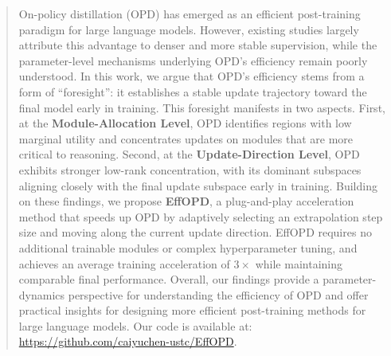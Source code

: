 \documentclass{article}
\begin{document}
\begin{abstract}
On-policy distillation (OPD) has emerged as an efficient post-training paradigm for large language models. However, existing studies largely attribute this advantage to denser and more stable supervision, while the parameter-level mechanisms underlying OPD's efficiency remain poorly understood. In this work, we argue that OPD's efficiency stems from a form of ``foresight'': it establishes a stable update trajectory toward the final model early in training. This foresight manifests in two aspects. First, at the \textbf{Module-Allocation Level}, OPD identifies regions with low marginal utility and concentrates updates on modules that are more critical to reasoning. Second, at the \textbf{Update-Direction Level}, OPD exhibits stronger low-rank concentration, with its dominant subspaces aligning closely with the final update subspace early in training. Building on these findings, we propose \textbf{EffOPD}, a plug-and-play acceleration method that speeds up OPD by adaptively selecting an extrapolation step size and moving along the current update direction. EffOPD requires no additional trainable modules or complex hyperparameter tuning, and achieves an average training acceleration of $3\times$ while maintaining comparable final performance. Overall, our findings provide a parameter-dynamics perspective for understanding the efficiency of OPD and offer practical insights for designing more efficient post-training methods for large language models. Our code is available at: \href{https://github.com/caiyuchen-ustc/EffOPD}{https://github.com/caiyuchen-ustc/EffOPD}.
\end{abstract}
\end{document}
